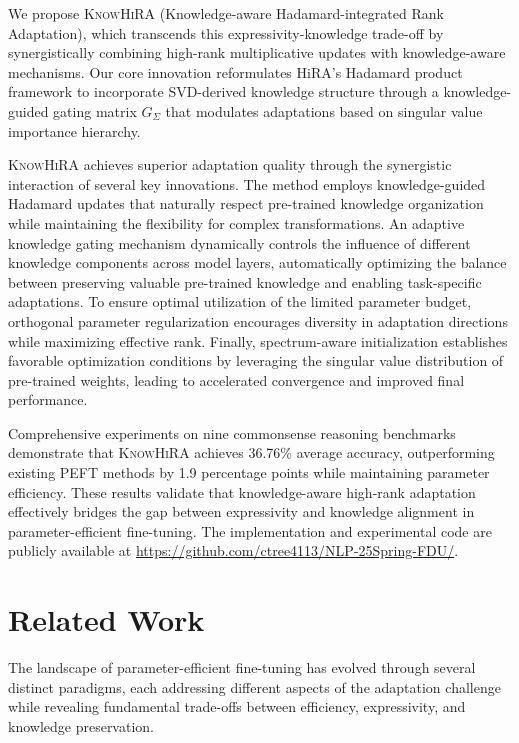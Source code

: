 \documentclass[10pt,letterpaper]{article}
\begin{document}
We propose \textsc{KnowHiRA} (Knowledge-aware Hadamard-integrated Rank Adaptation), which transcends this expressivity-knowledge trade-off by synergistically combining high-rank multiplicative updates with knowledge-aware mechanisms. Our core innovation reformulates HiRA's Hadamard product framework to incorporate SVD-derived knowledge structure through a knowledge-guided gating matrix $G_\Sigma$ that modulates adaptations based on singular value importance hierarchy.

\textsc{KnowHiRA} achieves superior adaptation quality through the synergistic interaction of several key innovations. The method employs knowledge-guided Hadamard updates that naturally respect pre-trained knowledge organization while maintaining the flexibility for complex transformations. An adaptive knowledge gating mechanism dynamically controls the influence of different knowledge components across model layers, automatically optimizing the balance between preserving valuable pre-trained knowledge and enabling task-specific adaptations. To ensure optimal utilization of the limited parameter budget, orthogonal parameter regularization encourages diversity in adaptation directions while maximizing effective rank. Finally, spectrum-aware initialization establishes favorable optimization conditions by leveraging the singular value distribution of pre-trained weights, leading to accelerated convergence and improved final performance.

Comprehensive experiments on nine commonsense reasoning benchmarks demonstrate that \textsc{KnowHiRA} achieves 36.76\% average accuracy, outperforming existing PEFT methods by 1.9 percentage points while maintaining parameter efficiency. These results validate that knowledge-aware high-rank adaptation effectively bridges the gap between expressivity and knowledge alignment in parameter-efficient fine-tuning. The implementation and experimental code are publicly available at \url{https://github.com/ctree4113/NLP-25Spring-FDU/}.

\section{Related Work}

The landscape of parameter-efficient fine-tuning has evolved through several distinct paradigms, each addressing different aspects of the adaptation challenge while revealing fundamental trade-offs between efficiency, expressivity, and knowledge preservation.
\end{document}
